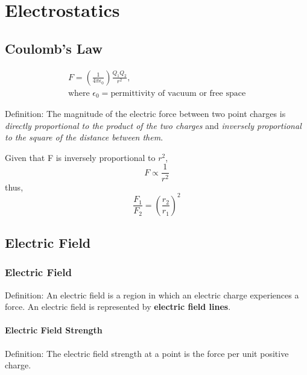 \documentclass[../../../main.tex]{subfiles}
\begin{document}
\setcounter{chapter}{11}
\chapter{Electrostatics}

\section{Coulomb's Law}

\begin{gather*}
    F=(\frac{1}{4\pi\epsilon_0})\frac{Q_1Q_2}{r^2}, \\
    \text{where } \epsilon_0= \text{permittivity of vacuum or free space}
\end{gather*}

\begin{mdframed}
    Definition: The magnitude of the electric force between two point charges is \emph{directly proportional to the product of the two charges} and \emph{inversely proportional to the square of the distance between them}.
\end{mdframed}
Given that F is inversely proportional to \(r^2\),
\begin{equation}
    F \propto \frac{1}{r^2}
\end{equation}
thus,
\begin{equation}
    \frac{F_1}{F_2}=(\frac{r_2}{r_1})^2
\end{equation}

\section{Electric Field}

\subsection{Electric Field}
\begin{mdframed}
    Definition: An electric field is a region in which an electric charge experiences a force. An electric field is represented by \textbf{electric field lines}.
\end{mdframed}

\subsubsection{Electric Field Strength}
\begin{mdframed}
    Definition: The electric field strength at a point is the force per unit positive charge.
\end{mdframed}
\end{document}
